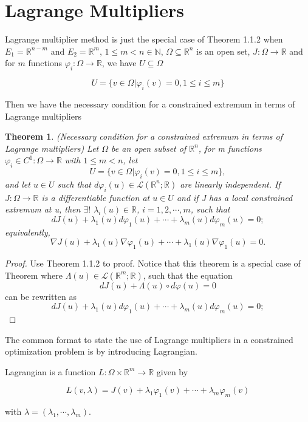 \documentclass[a4paper,12pt]{report}
\newtheorem{theorem}{Theorem}[section]
\begin{document}
\section{Lagrange Multipliers}

Lagrange multiplier method is just the special case of Theorem 1.1.2 when $E_1=\mathbb R^{n-m}$ and $E_2=\mathbb R^m$, $1\leq m < n\in \mathbb N$, $\Omega\subseteq\mathbb R^n$ is an open set, $J:\Omega\to\mathbb R$ and for $m$ functions $\varphi_i:\Omega\to\mathbb R$, we have $U\subseteq \Omega$

\[
    U=\{v\in\Omega|\varphi_i(v)=0,1\leq i\leq m\}
\]

Then we have the necessary condition for a constrained extremum in terms of Lagrange multipliers

\begin{theorem}
    (Necessary condition for a constrained extremum in terms of Lagrange multipliers) Let $\Omega$ be an open subset of $\mathbb R^n$, for m functions $\varphi_i\in C^1:\Omega\to\mathbb R$ with $1\leq m < n$, let
    \[
        U=\{v\in\Omega|\varphi_i(v)=0,1\leq i\leq m\},
    \]
    and let $u\in U$ such that $d\varphi_i(u)\in\mathcal L(\mathbb R^n;\mathbb R)$ are linearly independent. If $J:\Omega\to \mathbb R$ is a differentiable function at $u\in U$ and if J has a local constrained extremum at u, then $\exists!$ $\lambda_i(u)\in\mathbb R$, $i=1,2,\cdots,m$, such that
    \[
        dJ(u)+\lambda_1(u)d\varphi_1(u)+\cdots+\lambda_m(u)d\varphi_m(u)=0;
    \]
    equivalently,
    \[
        \nabla J(u)+\lambda_1(u)\nabla\varphi_1(u)+\cdots+\lambda_1(u)\nabla\varphi_1(u)=0.
    \]
\end{theorem}
\begin{proof}
    Use Theorem 1.1.2 to proof. Notice that this theorem is a special case of Theorem where $\Lambda(u)\in \mathcal L(\mathbb R^m;\mathbb R)$, such that the equation
    \[
        dJ(u)+\Lambda(u)\circ d\varphi(u)=0
    \]
    can be rewritten as 
    \[
        dJ(u)+\lambda_1(u)d\varphi_1(u)+\cdots+\lambda_m(u)d\varphi_m(u)=0;
    \]
\end{proof}

The common format to state the use of Lagrange multipliers in a constrained optimization problem is by introducing Lagrangian. 

Lagrangian is a function $L:\Omega\times\mathbb R^m\to\mathbb R$ given by

\[
    L(v,\lambda)=J(v)+\lambda_1\varphi_1(v)+\cdots+\lambda_m\varphi_m(v)
\]

with $\lambda=(\lambda_1,\cdots,\lambda_m)$. 
\end{document}
